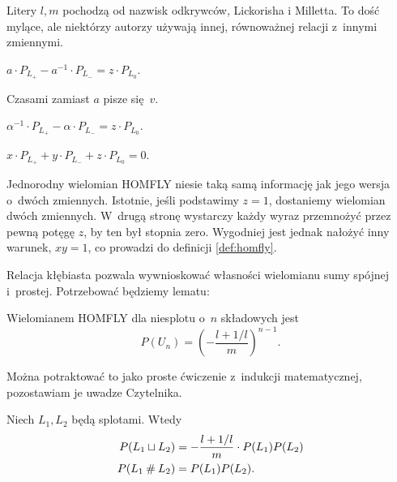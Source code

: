 Litery $l, m$ pochodzą od nazwisk odkrywców, Lickorisha i Milletta.
To dość mylące, ale niektórzy autorzy używają innej, równoważnej relacji z~innymi zmiennymi.

\begin{definition}
    $a \cdot P_{L_+} - a^{-1} \cdot P_{L_-} = z \cdot P_{L_0}$.
\end{definition}

Czasami zamiast $a$ pisze się $v$.

\begin{definition}
    $\alpha^{-1} \cdot P_{L_+} - \alpha \cdot P_{L_-} = z \cdot P_{L_0}$.
\end{definition}

\begin{definition}
    $x \cdot P_{L_+} + y \cdot P_{L_-} + z \cdot P_{L_0} = 0$.
\end{definition}

Jednorodny wielomian HOMFLY niesie taką samą informację jak jego wersja o~dwóch zmiennych.
Istotnie, jeśli podstawimy $z = 1$, dostaniemy wielomian dwóch zmiennych.
W~drugą stronę wystarczy każdy wyraz przemnożyć przez pewną potęgę $z$, by ten był stopnia zero.
Wygodniej jest jednak nałożyć inny warunek, $xy=1$, co prowadzi do definicji \ref{def:homfly}.

Relacja kłębiasta pozwala wywnioskować własności wielomianu sumy spójnej i~prostej.
Potrzebować będziemy lematu:

\begin{lemma}
    \label{links_homfly}
    Wielomianem HOMFLY dla niesplotu o~$n$ składowych jest
    \begin{equation}
        P(U_n) = \left(-\frac{l+1/l}{m}\right)^{n-1}.
    \end{equation}
\end{lemma}

Można potraktować to jako proste ćwiczenie z~indukcji matematycznej, pozostawiam je uwadze Czytelnika.

\begin{proposition}
    \label{homfly_sums}
    Niech $L_1, L_2$ będą splotami.
    Wtedy
    \begin{align}
        P(L_1 \sqcup L_2) & = - \frac{l + 1/l}{m} \cdot P(L_1) P(L_2) \\
        P(L_1 \mathbin{\#} L_2) & = P(L_1) P(L_2).
    \end{align}
\end{proposition}

